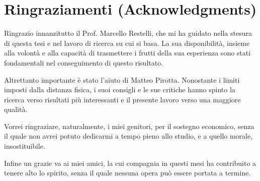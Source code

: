 
\bigskip

\begingroup
\let\clearpage\relax
\let\cleardoublepage\relax
\let\cleardoublepage\relax
\chapter*{Ringraziamenti (Acknowledgments)}

Ringrazio innanzitutto il Prof. Marcello Restelli, che mi ha guidato nella stesura di questa tesi e nel lavoro di ricerca su cui si basa. La sua disponibilità, insieme alla volontà e alla capacità di trasmettere i frutti della sua esperienza sono stati fondamentali nel conseguimento di questo risultato.

Altrettanto importante è stato l'aiuto di Matteo Pirotta. Nonostante i limiti imposti dalla distanza fisica, i suoi consigli e le sue critiche hanno spinto la ricerca verso risultati più interessanti e il presente lavoro verso una maggiore qualità.

Vorrei ringraziare, naturalmente, i miei genitori, per il sostegno economico, senza il quale non avrei potuto dedicarmi a tempo pieno allo studio, e a quello morale, insostituibile.

Infine un grazie va ai miei amici, la cui compagnia in questi mesi ha contribuito a tenere alto lo spirito, senza il quale nessuna opera può essere portata a termine.
\endgroup
